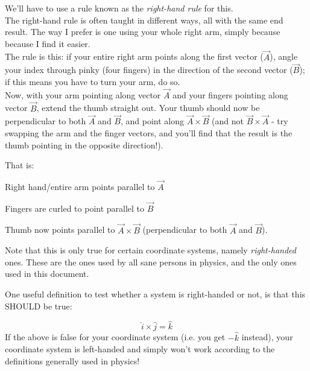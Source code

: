\documentclass[8.01x]{subfiles}
\begin{document}
We'll have to use a rule known as the \emph{right-hand rule} for this.\\
The right-hand rule is often taught in different ways, all with the same end result. The way I prefer is one using your whole right arm, simply because because I find it easier.\\
The rule is this: if your entire right arm points along the first vector ($\vec{A}$), angle your index through pinky (four fingers) in the direction of the second vector ($\vec{B}$); if this means you have to turn your arm, do so.\\
Now, with your arm pointing along vector $\vec{A}$ and your fingers pointing along vector $\vec{B}$, extend the thumb straight out. Your thumb should now be perpendicular to both $\vec{A}$ and $\vec{B}$, and point along $\vec{A} \times \vec{B}$ (and not $\vec{B} \times \vec{A}$ - try swapping the arm and the finger vectors, and you'll find that the result is the thumb pointing in the opposite direction!).

That is:

\begin{itemize*}
\item Right hand/entire arm points parallel to $\vec{A}$
\item Fingers are curled to point parallel to $\vec{B}$
\item Thumb now points parallel to $\vec{A} \times \vec{B}$ (perpendicular to both $\vec{A}$ and $\vec{B}$).
\end{itemize*}

Note that this is only true for certain coordinate systems, namely \emph{right-handed} ones. These are the ones used by all sane persons in physics, and the only ones used in this document.

One useful definition to test whether a system is right-handed or not, is that this SHOULD be true:

\[ \hat{i} \times \hat{j} = \hat{k} \]
If the above is false for your coordinate system (i.e. you get $-\hat{k}$ instead), your coordinate system is left-handed and simply won't work according to the definitions generally used in physics!
\end{document}
